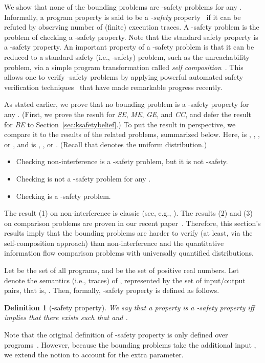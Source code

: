 \documentclass{llncs}
\newtheorem{definition}[theorem]{Definition}
\begin{document}
We show that none of the bounding problems are -safety problems for
any .  Informally, a program property is said to be a {\em
  -safety}
property~\cite{terauchi:sas05,DBLP:conf/csfw/ClarksonS08} if it can be
refuted by observing  number of (finite) execution traces.  A
-safety problem is the problem of checking a -safety property.
Note that the standard safety property is a -safety property.  An
important property of a -safety problem is that it can be reduced
to a standard safety (i.e., -safety) problem, such as the
unreachability problem, via a simple program transformation called
{\em self composition}~\cite{barthe:csfw04,darvas:spc05}.  This allows
one to verify -safety problems by applying powerful automated
safety verification
techniques~\cite{DBLP:conf/popl/BallR02,DBLP:conf/popl/HenzingerJMS02,mcmillan:cav06,DBLP:journals/sttt/BeyerHJM07}
that have made remarkable progress recently.

As stated earlier, we prove that no bounding problem is a -safety
property for any .  (First, we prove the result for {\it SE}, {\it
  ME}, {\it GE}, and {\it CC}, and defer the result for {\it BE} to
Section~\ref{sec:ksafetybelief}.)  To put the result in perspective, we
compare it to the results of the related problems, summarized below.
Here,  is , , , or
, and  is , , or .  (Recall that  denotes the uniform distribution.)
\begin{itemize}
\item[(1)] Checking non-interference is a -safety problem, but it is not -safety.
\item[(2)] Checking  is not a -safety problem for any .
\item[(3)] Checking  is a -safety problem.
\end{itemize}
The result (1) on non-interference is classic (see, e.g.,
\cite{mclean:sp94,barthe:csfw04,darvas:spc05}).  The results (2) and
(3) on comparison problems are proven in our recent
paper~\cite{DBLP:conf/csfw/yasuoka2010}.  Therefore, this section's
results imply that the bounding problems are harder to verify (at
least, via the self-composition approach) than non-interference and
the quantitative information flow comparison problems with universally
quantified distributions.

Let  be the set of all programs, and 
  be the set of positive real numbers.  Let  denote the
  semantics (i.e., traces) of , represented by the set of
  input/output pairs, that is, .  Then,
  formally, -safety property is defined as follows.
\begin{definition}[-safety property]
We say that a property 
is a -safety property iff  implies that there exists
 such that  and .
\end{definition}
Note that the original definition of -safety property is only
defined over
programs~\cite{terauchi:sas05,DBLP:conf/csfw/ClarksonS08}.  However,
because the bounding problems take the additional input , we extend
the notion to account for the extra parameter.
\end{document}
